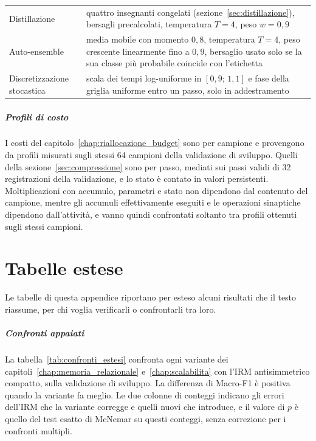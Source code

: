 \begin{table}[ht]
\begin{tabularx}{\textwidth}{@{}>{\raggedright\arraybackslash}p{3.5cm} >{\raggedright\arraybackslash}X@{}}
Distillazione & quattro insegnanti congelati (sezione~\ref{sec:distillazione}), bersagli precalcolati, temperatura $T=4$, peso $w=0{,}9$ \\
Auto-ensemble & media mobile con momento $0{,}8$, temperatura $T=4$, peso crescente linearmente fino a $0{,}9$, bersaglio usato solo se la sua classe più probabile coincide con l'etichetta \\
Discretizzazione stocastica & scala dei tempi log-uniforme in $[0{,}9;\,1{,}1]$ e fase della griglia uniforme entro un passo, solo in addestramento \\
\hline
\end{tabularx}
\end{table}

\paragraph{Profili di costo}
I costi del capitolo~\ref{chap:riallocazione_budget} sono per campione e provengono da profili misurati sugli stessi 64 campioni della validazione di sviluppo. Quelli della sezione~\ref{sec:compressione} sono per passo, mediati sui passi validi di 32 registrazioni della validazione, e lo stato è contato in valori persistenti. Moltiplicazioni con accumulo, parametri e stato non dipendono dal contenuto del campione, mentre gli accumuli effettivamente eseguiti e le operazioni sinaptiche dipendono dall'attività, e vanno quindi confrontati soltanto tra profili ottenuti sugli stessi campioni.


\chapter{Tabelle estese}
\label{app:tabelle_estese}

Le tabelle di questa appendice riportano per esteso alcuni risultati che il testo riassume, per chi voglia verificarli o confrontarli tra loro.

\paragraph{Confronti appaiati}
La tabella~\ref{tab:confronti_estesi} confronta ogni variante dei capitoli~\ref{chap:memoria_relazionale} e~\ref{chap:scalabilita} con l'IRM antisimmetrico compatto, sulla validazione di sviluppo. La differenza di Macro-F1 è positiva quando la variante fa meglio. Le due colonne di conteggi indicano gli errori dell'IRM che la variante corregge e quelli nuovi che introduce, e il valore di $p$ è quello del test esatto di McNemar su questi conteggi, senza correzione per i confronti multipli.

